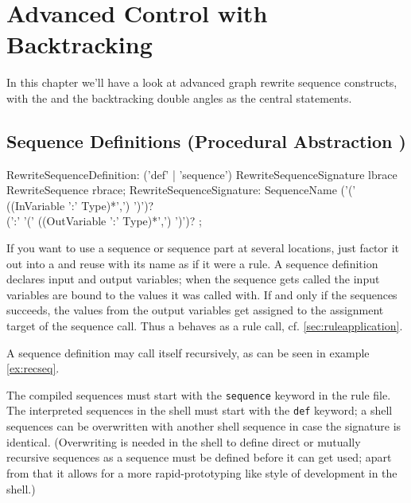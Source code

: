 \chapter{Advanced Control with Backtracking}\label{cha:transaction}

In this chapter we'll have a look at advanced graph rewrite sequence constructs,
with the  and the backtracking double angles as the central statements.


\section{Sequence Definitions (Procedural Abstraction )} \label{sec:sequencedefinition}
\begin{rail}
  RewriteSequenceDefinition: 
    ('def' | 'sequence') RewriteSequenceSignature lbrace RewriteSequence rbrace;
  RewriteSequenceSignature: 
    SequenceName ('(' ((InVariable ':' Type)*',') ')')? \\ (':' '(' ((OutVariable ':' Type)*',') ')')?
	;
\end{rail}

If you want to use a sequence or sequence part at several locations, just factor it out into a  and reuse with its name as if it were a rule.
A sequence definition declares input and output variables; 
when the sequence gets called the input variables are bound to the values it was called with.
If and only if the sequences succeeds, the values from the output variables get assigned to the assignment target of the sequence call.
Thus a  behaves as a rule call, cf. \ref{sec:ruleapplication}.

A sequence definition may call itself recursively, as can be seen in example \ref{ex:recseq}.

The compiled sequences must start with the \texttt{sequence} keyword in the rule file.
The interpreted sequences in the shell must start with the \texttt{def} keyword; a shell sequences can be overwritten with another shell sequence in case the signature is identical. (Overwriting is needed in the shell to define direct or mutually recursive sequences as a sequence must be defined before it can get used; apart from that it allows for a more rapid-prototyping like style of development in the shell.)

